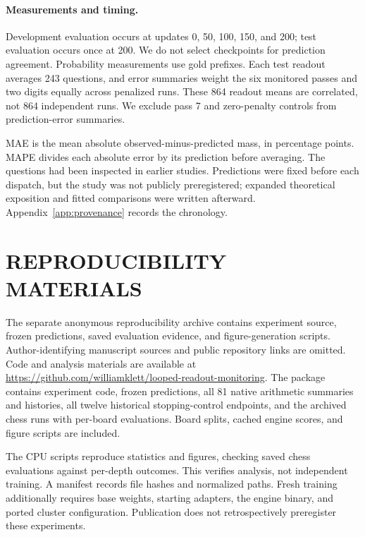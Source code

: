 \paragraph{Measurements and timing.}
Development evaluation occurs at updates 0, 50, 100, 150, and 200; test evaluation occurs once at 200. We do not select checkpoints for prediction agreement. Probability measurements use gold prefixes. Each test readout averages 243 questions, and error summaries weight the six monitored passes and two digits equally across penalized runs. These 864 readout means are correlated, not 864 independent runs. We exclude pass 7 and zero-penalty controls from prediction-error summaries.

MAE is the mean absolute observed-minus-predicted mass, in percentage points. MAPE divides each absolute error by its prediction before averaging. The questions had been inspected in earlier studies. Predictions were fixed before each dispatch, but the study was not publicly preregistered; expanded theoretical exposition and fitted comparisons were written afterward. Appendix~\ref{app:provenance} records the chronology.



\section{REPRODUCIBILITY MATERIALS}\label{app:public-code}
\ifdefined\AnonymousSubmission
The separate anonymous reproducibility archive contains experiment source, frozen predictions, saved evaluation evidence, and figure-generation scripts. Author-identifying manuscript sources and public repository links are omitted.
\else
Code and analysis materials are available at
\url{https://github.com/williamklett/looped-readout-monitoring}.
The package contains experiment code, frozen predictions, all 81 native arithmetic summaries and histories, all twelve historical stopping-control endpoints, and the archived chess runs with per-board evaluations. Board splits, cached engine scores, and figure scripts are included.
\fi

The CPU scripts reproduce statistics and figures, checking saved chess evaluations against per-depth outcomes. This verifies analysis, not independent training. A manifest records file hashes and normalized paths. Fresh training additionally requires base weights, starting adapters, the engine binary, and ported cluster configuration. Publication does not retrospectively preregister these experiments.


